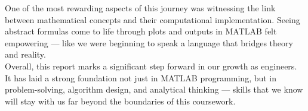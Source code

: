 \documentclass[12pt]{report}
\begin{document}
One of the most rewarding aspects of this journey was witnessing the link between mathematical concepts and their computational implementation. Seeing abstract formulas come to life through plots and outputs in MATLAB felt empowering — like we were beginning to speak a language that bridges theory and reality.\\

Overall, this report marks a significant step forward in our growth as engineers. It has laid a strong foundation not just in MATLAB \cite{matlabdoc} programming, but in problem-solving, algorithm design, and analytical thinking — skills that we know will stay with us far beyond the boundaries of this coursework.

\end{document}
